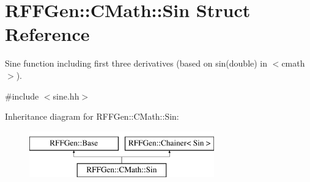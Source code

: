 \hypertarget{structRFFGen_1_1CMath_1_1Sin}{\section{R\-F\-F\-Gen\-:\-:C\-Math\-:\-:Sin Struct Reference}
\label{structRFFGen_1_1CMath_1_1Sin}
}


Sine function including first three derivatives (based on sin(double) in $<$cmath$>$).  




{\ttfamily \#include $<$sine.\-hh$>$}

Inheritance diagram for R\-F\-F\-Gen\-:\-:C\-Math\-:\-:Sin\-:\begin{figure}[H]
\begin{center}
\leavevmode
\includegraphics[height=2.000000cm]{structRFFGen_1_1CMath_1_1Sin}
\end{center}
\end{figure}
